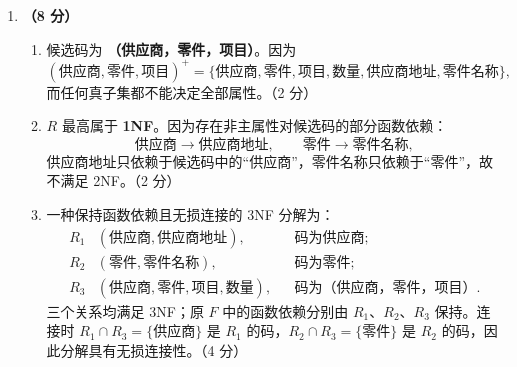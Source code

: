 \documentclass[a4paper,11pt]{article}
\begin{document}
\begin{enumerate}[start=21, label=\textbf{\arabic*.}, leftmargin=2.4em, itemsep=0.45em]
\begin{enumerate}[label=（\arabic*）, leftmargin=2.2em, itemsep=2pt]
  \item 创建 Works 表：
\begin{lstlisting}[language=SQL]
CREATE TABLE Works (
    Eno   CHAR(9) NOT NULL,
    Pno   CHAR(6) NOT NULL,
    Hours DECIMAL(5,1),
    PRIMARY KEY (Eno, Pno),
    FOREIGN KEY (Eno) REFERENCES Employee(Eno),
    FOREIGN KEY (Pno) REFERENCES Project(Pno),
    CHECK (Hours > 0)
);
\end{lstlisting}
\hfill（2.5 分）
\end{enumerate}

\item \textbf{（8 分）}
\begin{enumerate}[label=（\arabic*）, leftmargin=2.2em, itemsep=2pt]
  \item 候选码为 \textbf{（供应商，零件，项目）}。因为
  \[
  (\text{供应商},\text{零件},\text{项目})^{+}
  =\{\text{供应商},\text{零件},\text{项目},\text{数量},\text{供应商地址},\text{零件名称}\},
  \]
  而任何真子集都不能决定全部属性。\hfill（2 分）

  \item $R$ 最高属于 \textbf{1NF}。因为存在非主属性对候选码的部分函数依赖：
  \[
  \text{供应商}\to\text{供应商地址},\qquad \text{零件}\to\text{零件名称},
  \]
  供应商地址只依赖于候选码中的“供应商”，零件名称只依赖于“零件”，故不满足 2NF。\hfill（2 分）

  \item 一种保持函数依赖且无损连接的 3NF 分解为：
  \[
  \begin{aligned}
  R_1&(\text{供应商},\text{供应商地址}), &&\text{码为供应商};\\
  R_2&(\text{零件},\text{零件名称}), &&\text{码为零件};\\
  R_3&(\text{供应商},\text{零件},\text{项目},\text{数量}), &&\text{码为（供应商，零件，项目）}.
  \end{aligned}
  \]
  三个关系均满足 3NF；原 $F$ 中的函数依赖分别由 $R_1$、$R_2$、$R_3$ 保持。连接时 $R_1\cap R_3=\{\text{供应商}\}$ 是 $R_1$ 的码，$R_2\cap R_3=\{\text{零件}\}$ 是 $R_2$ 的码，因此分解具有无损连接性。\hfill（4 分）
\end{enumerate}


\end{enumerate}
\end{document}
